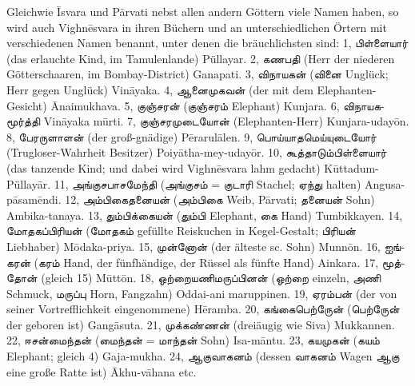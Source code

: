 \documentclass{article}
\newcommand{\TamilText}[1]{\texttamil{#1}}
\newcommand{\tam}[1]{\TamilText{#1}}
\begin{document}
Gleichwie \={I}svara und P\={a}rvati nebst allen andern Göttern viele Namen haben, so wird auch Vighn\={e}svara in ihren Büchern und an unterschiedlichen Örtern mit verschiedenen Namen benannt, unter denen die bräuchlichsten sind: 1, \tam{பிள்ளையார்} (das erlauchte Kind, im Tamulenlande) Püllayar. 2, \tam{கணபதி} (Herr der niederen Götterschaaren, im Bombay-District) Ganapati. 3, \tam{விநாயகன்} (\tam{வினை} Unglück; Herr gegen Unglück) Vin\={a}yaka. 4, \tam{ஆனைமுகவன்} (der mit dem Elephanten-Gesicht) \={A}naimukhava. 5, \tam{குஞ்சரன்} (\tam{குஞ்சரம்} Elephant) Kunjara. 6, \tam{விநாயகமூர்த்தி} Vin\={a}yaka m\={u}rti. 7, \tam{குஞ்சரமுடையோன்} (Elephanten-Herr) Kunjara-uday\={o}n. 8, \tam{பேரருளாளன்} (der groß-gnädige) P\={e}rarul\={a}len. 9, \tam{பொய்யாதமெய்யுடையோர்} (Trugloser-Wahrheit Besitzer) Poiy\={a}tha-mey-uday\={o}r. 10, \tam{கூத்தாடும்பிள்ளையார்} (das tanzende Kind; und dabei wird Vighn\={e}svara lahm gedacht) K\={u}ttadum-Püllay\={a}r. 11, \tam{அங்குசபாசமேந்தி} (\tam{அங்குசம்} = \tam{குடாரி} Stachel; \tam{ஏந்து} halten) Angusa-p\={a}sam\={e}ndi. 12, \tam{அம்பிகைதனையன்} (\tam{அம்பிகை} Weib, P\={a}rvati; \tam{தனையன்} Sohn) Ambika-tanaya. 13, \tam{தும்பிக்கையன்} (\tam{தும்பி} Elephant, \tam{கை} Hand) Tumbikkayen. 14, \tam{மோதகப்பிரியன்} (\tam{மோதகம்} gefüllte Reiskuchen in Kegel-Gestalt; \tam{பிரியன்} Liebhaber) M\={o}daka-priya. 15, \tam{முன்னோன்} (der älteste sc. Sohn) Munn\={o}n. 16, \tam{ஐங்கரன்} (\tam{கரம்} Hand, der fünfhändige, der Rüssel als fünfte Hand) Ainkara. 17, \tam{மூத்தோன்} (gleich 15) M\={u}tt\={o}n. 18, \tam{ஒற்றையணிமருப்பினன்} (\tam{ஒற்றை} einzeln, \tam{அணி} Schmuck, \tam{மருப்பு} Horn, Fangzahn) Oddai-ani maruppinen. 19, \tam{ஏரம்பன்} (der von seiner Vortrefflichkeit eingenommene) H\={e}ramba. 20, \tam{கங்கைபெற்ருேன்} (\tam{பெற்ருேன்} der geboren ist) Gang\={a}suta. 21, \tam{முக்கண்ணன்} (dreiäugig wie Siva) Mukkannen. 22, \tam{ஈசன்மைந்தன்} (\tam{மைந்தன்} = \tam{மாந்தன்} Sohn) Isa-m\={a}ntu. 23, \tam{கயமுகன்} (\tam{கயம்} Elephant; gleich 4) Gaja-mukha. 24, \tam{ஆகுவாகனம்} (dessen \tam{வாகனம்} Wagen \tam{ஆகு} eine große Ratte ist) \={A}khu-v\={a}hana etc.
\end{document}

